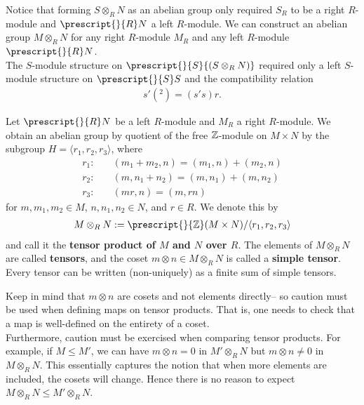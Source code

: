 \documentclass{memoir}
\begin{document}
Notice that forming \(S\otimes_R N\) as an abelian group only required \(S_R\) to be a right \(R\)-module and \(\prescript{}{R}N\) a left \(R\)-module. We can construct an abelian group \(M \otimes_R N\) for any right \(R\)-module \(M_R\) and any left \(R\)-module \(\prescript{}{R}N\).\\

The \(S\)-module structure on \(\prescript{}{S}{(S \otimes_R N)}\) required only a left \(S\)-module structure on \(\prescript{}{S}S\) and the compatibility relation
\begin{align*}
	s'(^2) = (s's)r.
\end{align*}

\begin{defn}[Tensor]
	Let \(\prescript{}{R}N\) be a left \(R\)-module and \(M_R\) a right \(R\)-module. We obtain an abelian group by quotient of the free \(\mathbb{Z}\)-module on \(M\times N\) by the subgroup \(H = \langle r_1,r_2,r_3 \rangle \), where
	\begin{align*}
		r_1:& \quad (m_1+m_2,n) = (m_1,n) + (m_2,n)\\
		r_2:& \quad (m, n_1+n_2) = (m,n_1) + (m,n_2)\\
		r_3:& \quad (mr,n) = (m,rn)
	\end{align*}
	for \(m,m_1,m_2 \in M\), \(n,n_1,n_2 \in N\), and \(r \in R\). We denote this by
	\begin{align*}
		M \otimes_R N := \prescript{}{\Z}(M \times N) / \langle r_1,r_2,r_3 \rangle 
	\end{align*}
	and call it the \textbf{tensor product of \(M\) and \(N\) over \(R\)}. The elements of \(M \otimes_R N\) are called \textbf{tensors}, and the coset \(m \otimes n \in M \otimes_R N\) is called a \textbf{simple tensor}. Every tensor can be written (non-uniquely) as a finite sum of simple tensors.
\end{defn}
Keep in mind that \(m \otimes n\) are cosets and not elements directly-- so caution must be used when defining maps on tensor products. That is, one needs to check that a map is well-defined on the entirety of a coset.\\

Furthermore, caution must be exercised when comparing tensor products. For example, if \(M \leq M'\), we can have \(m \otimes n = 0\) in \(M' \otimes_R N\) but \(m \otimes n \neq 0\) in \(M \otimes_R N\). This essentially captures the notion that when more elements are included, the cosets will change. Hence there is no reason to expect \(M \otimes_R N \leq M' \otimes_R N\).
\end{document}
